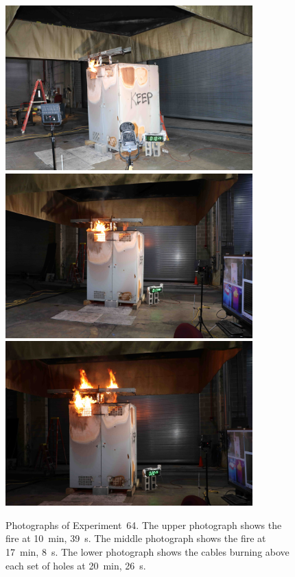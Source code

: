 \begin{figure}[p]
\centering
\includegraphics[height=2.50in]{../FIGURES/Test_64_10_min_39_s} \\
\includegraphics[height=2.50in]{../FIGURES/Test_64_17_min_8_s} \\
\includegraphics[height=2.50in]{../FIGURES/Test_64_20_min_26_s}
\caption[Photographs of Experiment~64]{Photographs of Experiment~64. The upper photograph shows the fire at 10~min, 39~s. The middle photograph shows the fire at 17~min, 8~s. The lower photograph shows the cables burning above each set of holes at 20~min, 26~s.}
\label{fig:Test_64_photos}
\end{figure}




